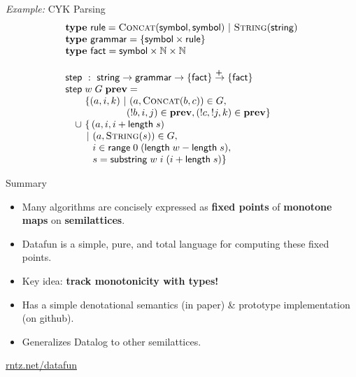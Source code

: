 \documentclass{beamer}
\newcommand{\mto}{\overset{\textbf{+}\:}{\to}}
\newcommand{\m}[1]{\ensuremath{\mathbf{#1}}}
\newcommand{\ms}{\mathsf}
\newcommand{\N}{\mathbb{N}}
\newcommand{\x}{\times}
\begin{document}
\begin{frame}{{\it Example:} CYK Parsing}
  \[\begin{array}{l}
    \textbf{type}~\ms{rule} = \textsc{Concat}(\ms{symbol}, \ms{symbol})
    ~|~ \textsc{String}(\ms{string})\\
    \textbf{type}~\ms{grammar} = \{\ms{symbol} \times \ms{rule}\}\\
    \textbf{type}~\ms{fact} = \ms{symbol} \x \N \x \N\\
    \\
    \ms{step} ~:~ \ms{string} \to \ms{grammar} \to \{\ms{fact}\} \mto \{\ms{fact}\}\\
    \ms{step}\; w\; G\; \m{prev} =\\
    \quad \phantom{\cup}~\{ (a,i,k) ~|~ (a, \textsc{Concat}(b,c)) \in G,\\
    \quad \phantom{\cup}~\hspace{4.24em} (!b,i,j) \in \m{prev},
                   (!c,!j,k) \in \m{prev} \}\\
    \quad\cup~ \{ \, (a, i, i + \ms{length}\;s)\\
    \quad\phantom{\cup}\,~|~ (a, \textsc{String}(s)) \in G,\\
    \quad\phantom{\cup\,~|~} i \in \ms{range}\; 0\; (\ms{length}\; w - \ms{length}\; s),\\
    \quad\phantom{\cup\,~|~} s = \ms{substring}\; w\; i\; (i + \ms{length}\; s) \}
  \end{array}\]
\end{frame}





\begin{frame}{Summary}\large

  \begin{itemize}
  \item Many algorithms are concisely expressed as \textbf{fixed points} of
    \textbf{monotone maps} on \textbf{semilattices}.
  \item Datafun is a simple, pure, and total language for computing these fixed
    points.
  \item Key idea: \textbf{track monotonicity with types!}
  \item Has a simple denotational semantics (in paper) \& prototype
    implementation (on github).
  \item Generalizes Datalog to other semilattices.
  \end{itemize}

  \begin{center}
    \huge \url{rntz.net/datafun}
  \end{center}
\end{frame}
\end{document}
